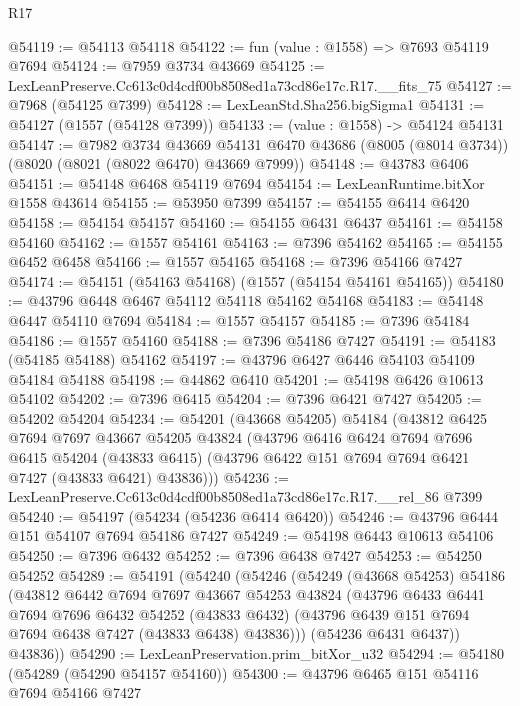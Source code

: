 \begin{lexlean}{R17}
\begin{coremodule}
@54119 := @54113 @54118
@54122 := fun (value : @1558) => @7693 @54119 @7694
@54124 := @7959 @3734 @43669
@54125 := LexLeanPreserve.Cc613c0d4cdf00b8508ed1a73cd86e17c.R17.__fits_75
@54127 := @7968 (@54125 @7399)
@54128 := LexLeanStd.Sha256.bigSigma1
@54131 := @54127 (@1557 (@54128 @7399))
@54133 := (value : @1558) -> @54124 @54131
@54147 := @7982
    @3734
    @43669
    @54131
    @6470
    @43686
    (@8005 (@8014 @3734))
    (@8020 (@8021 (@8022 @6470) @43669 @7999))
@54148 := @43783 @6406
@54151 := @54148 @6468 @54119 @7694
@54154 := LexLeanRuntime.bitXor @1558 @43614
@54155 := @53950 @7399
@54157 := @54155 @6414 @6420
@54158 := @54154 @54157
@54160 := @54155 @6431 @6437
@54161 := @54158 @54160
@54162 := @1557 @54161
@54163 := @7396 @54162
@54165 := @54155 @6452 @6458
@54166 := @1557 @54165
@54168 := @7396 @54166 @7427
@54174 := @54151 (@54163 @54168) (@1557 (@54154 @54161 @54165))
@54180 := @43796 @6448 @6467 @54112 @54118 @54162 @54168
@54183 := @54148 @6447 @54110 @7694
@54184 := @1557 @54157
@54185 := @7396 @54184
@54186 := @1557 @54160
@54188 := @7396 @54186 @7427
@54191 := @54183 (@54185 @54188) @54162
@54197 := @43796 @6427 @6446 @54103 @54109 @54184 @54188
@54198 := @44862 @6410
@54201 := @54198 @6426 @10613 @54102
@54202 := @7396 @6415
@54204 := @7396 @6421 @7427
@54205 := @54202 @54204
@54234 := @54201
    (@43668 @54205)
    @54184
    (@43812
      @6425
      @7694
      @7697
      @43667
      @54205
      @43824
      (@43796
        @6416
        @6424
        @7694
        @7696
        @6415
        @54204
        (@43833 @6415)
        (@43796 @6422 @151 @7694 @7694 @6421 @7427 (@43833 @6421) @43836)))
@54236 := LexLeanPreserve.Cc613c0d4cdf00b8508ed1a73cd86e17c.R17.__rel_86 @7399
@54240 := @54197 (@54234 (@54236 @6414 @6420))
@54246 := @43796 @6444 @151 @54107 @7694 @54186 @7427
@54249 := @54198 @6443 @10613 @54106
@54250 := @7396 @6432
@54252 := @7396 @6438 @7427
@54253 := @54250 @54252
@54289 := @54191
    (@54240
      (@54246
        (@54249
          (@43668 @54253)
          @54186
          (@43812
            @6442
            @7694
            @7697
            @43667
            @54253
            @43824
            (@43796
              @6433
              @6441
              @7694
              @7696
              @6432
              @54252
              (@43833 @6432)
              (@43796 @6439 @151 @7694 @7694 @6438 @7427 (@43833 @6438) @43836)))
          (@54236 @6431 @6437))
        @43836))
@54290 := LexLeanPreservation.prim_bitXor_u32
@54294 := @54180 (@54289 (@54290 @54157 @54160))
@54300 := @43796 @6465 @151 @54116 @7694 @54166 @7427

\end{coremodule}
\end{lexlean}
